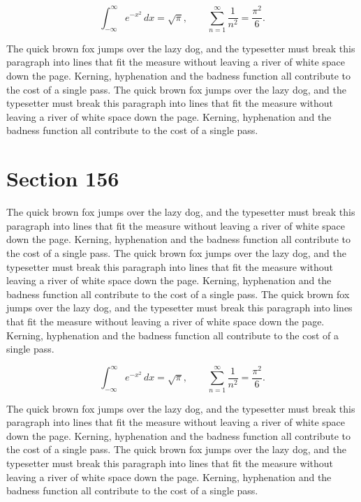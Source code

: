\documentclass{article}
\begin{document}
\begin{equation}
\int_{-\infty}^{\infty} e^{-x^{2}}\,dx = \sqrt{\pi}, \qquad
\sum_{n=1}^{\infty} \frac{1}{n^{2}} = \frac{\pi^{2}}{6}.
\end{equation}

The quick brown fox jumps over the lazy dog, and the typesetter must break this paragraph into lines that fit the measure without leaving a river of white space down the page. Kerning, hyphenation and the badness function all contribute to the cost of a single pass. The quick brown fox jumps over the lazy dog, and the typesetter must break this paragraph into lines that fit the measure without leaving a river of white space down the page. Kerning, hyphenation and the badness function all contribute to the cost of a single pass. 
\section{Section 156}
The quick brown fox jumps over the lazy dog, and the typesetter must break this paragraph into lines that fit the measure without leaving a river of white space down the page. Kerning, hyphenation and the badness function all contribute to the cost of a single pass. The quick brown fox jumps over the lazy dog, and the typesetter must break this paragraph into lines that fit the measure without leaving a river of white space down the page. Kerning, hyphenation and the badness function all contribute to the cost of a single pass. The quick brown fox jumps over the lazy dog, and the typesetter must break this paragraph into lines that fit the measure without leaving a river of white space down the page. Kerning, hyphenation and the badness function all contribute to the cost of a single pass. 

\begin{equation}
\int_{-\infty}^{\infty} e^{-x^{2}}\,dx = \sqrt{\pi}, \qquad
\sum_{n=1}^{\infty} \frac{1}{n^{2}} = \frac{\pi^{2}}{6}.
\end{equation}

The quick brown fox jumps over the lazy dog, and the typesetter must break this paragraph into lines that fit the measure without leaving a river of white space down the page. Kerning, hyphenation and the badness function all contribute to the cost of a single pass. The quick brown fox jumps over the lazy dog, and the typesetter must break this paragraph into lines that fit the measure without leaving a river of white space down the page. Kerning, hyphenation and the badness function all contribute to the cost of a single pass. 
\end{document}
